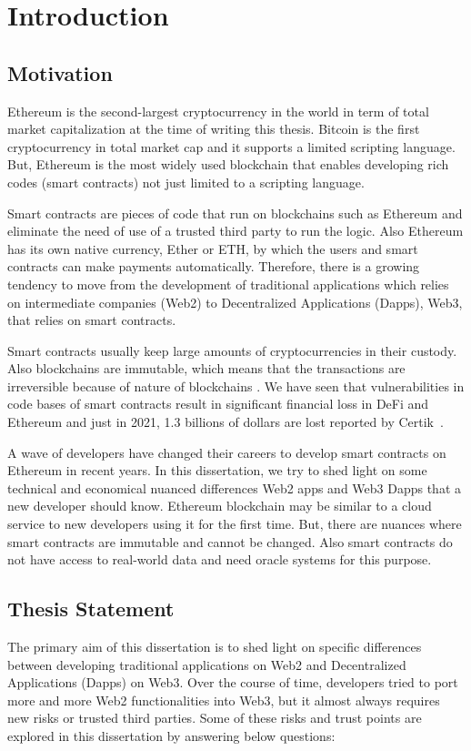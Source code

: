 \chapter{Introduction}


\section{Motivation}
Ethereum is the second-largest cryptocurrency in the world in term of total market capitalization at the time of writing this thesis. Bitcoin is the first cryptocurrency in total market cap and it supports a limited scripting language. But, Ethereum is the most widely used blockchain that enables developing rich codes (smart contracts) not just limited to a scripting language.

Smart contracts are pieces of code that run on blockchains such as Ethereum and eliminate the need of use of a trusted third party to run the logic. Also Ethereum has its own native currency, Ether or ETH, by which the users and smart contracts can make payments automatically.
Therefore, there is a growing tendency to move from the development of traditional applications which relies on intermediate companies (Web2) to Decentralized Applications (Dapps), Web3, that relies on smart contracts. 

Smart contracts usually keep large amounts of cryptocurrencies in their custody. Also blockchains are immutable, which means that the transactions are irreversible because of nature of blockchains . 
We have seen that vulnerabilities in code bases of smart contracts result in significant financial loss in DeFi and Ethereum and just in 2021, 1.3 billions of dollars are lost reported by Certik~\cite{certikReport}.


A wave of developers have changed their careers to develop smart contracts on Ethereum in recent years. In this dissertation, we try to shed light on some technical and economical nuanced differences Web2 apps and Web3 Dapps that a new developer should know. Ethereum blockchain may be similar to a cloud service to new developers using it for the first time. But, there are nuances where smart contracts are immutable and cannot be changed. Also smart contracts do not have access to real-world data and need oracle systems for this purpose.


\section{Thesis Statement}
The primary aim of this dissertation is to shed light on specific differences between developing traditional applications on Web2 and Decentralized Applications (Dapps) on Web3. Over the course of time, developers tried to port more and more Web2 functionalities into Web3, but it almost always requires new risks or trusted third parties. Some of these risks and trust points are explored in this dissertation by answering below questions:

